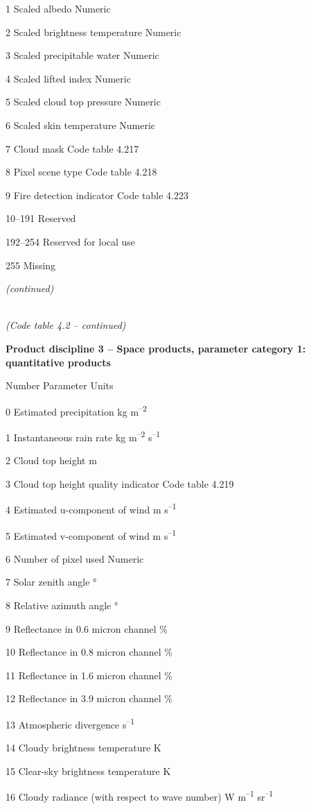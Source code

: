 1 Scaled albedo Numeric

2 Scaled brightness temperature Numeric

3 Scaled precipitable water Numeric

4 Scaled lifted index Numeric

5 Scaled cloud top pressure Numeric

6 Scaled skin temperature Numeric

7 Cloud mask Code table 4.217

8 Pixel scene type Code table 4.218

9 Fire detection indicator Code table 4.223

10--191 Reserved

192--254 Reserved for local use

255 Missing

\emph{(continued)}

\emph{\\
(Code table 4.2 -- continued)}

\textbf{Product discipline 3 -- Space products, parameter category 1: quantitative products}

Number Parameter Units

0 Estimated precipitation kg m\textsuperscript{--2}

1 Instantaneous rain rate kg m\textsuperscript{--2} s\textsuperscript{--1}

2 Cloud top height m

3 Cloud top height quality indicator Code table 4.219

4 Estimated u-component of wind m s\textsuperscript{--1}

5 Estimated v-component of wind m s\textsuperscript{--1}

6 Number of pixel used Numeric

7 Solar zenith angle °

8 Relative azimuth angle °

9 Reflectance in 0.6 micron channel \%

10 Reflectance in 0.8 micron channel \%

11 Reflectance in 1.6 micron channel \%

12 Reflectance in 3.9 micron channel \%

13 Atmospheric divergence s\textsuperscript{--1}

14 Cloudy brightness temperature K

15 Clear-sky brightness temperature K

16 Cloudy radiance (with respect to wave number) W m\textsuperscript{--1} sr\textsuperscript{--1}

